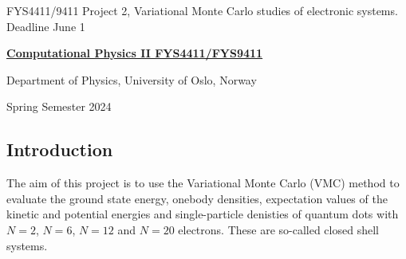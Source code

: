 \documentclass[%
oneside,                 %
final,                   %
10pt]{article}
\begin{document}

\newcommand{\exercisesection}[1]{\subsection*{#1}}






\thispagestyle{empty}

\begin{center}
{\LARGE\bf
\begin{spacing}{1.25}
FYS4411/9411 Project 2, Variational Monte Carlo studies of electronic systems. Deadline June 1
\end{spacing}
}
\end{center}


\begin{center}
{\bf \href{{http://www.uio.no/studier/emner/matnat/fys/FYS4411/index-eng.html}}{Computational Physics II FYS4411/FYS9411}}
\end{center}

    \begin{center}
\centerline{{\small Department of Physics, University of Oslo, Norway}}
\end{center}
    

\begin{center}
Spring Semester 2024
\end{center}

\vspace{1cm}


\subsection*{Introduction}

The aim of this project is to use the Variational Monte
Carlo (VMC) method to evaluate 
the ground state energy, onebody densities, expectation values of the kinetic and potential energies 
 and single-particle denisties of 
quantum dots with $N=2$, $N=6$, $N=12$ and $N=20$ electrons. These are so-called closed shell systems.
\end{document}
